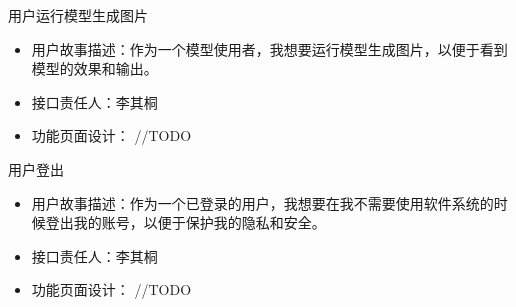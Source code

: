 \begin{frame}{用户运行模型生成图片}
    \begin{itemize}
        \item 用户故事描述：作为一个模型使用者，我想要运行模型生成图片，以便于看到模型的效果和输出。
        \item 接口责任人：李其桐
        \item 功能页面设计： //TODO
    \end{itemize}
\end{frame}

\begin{frame}{用户登出}
    \begin{itemize}
        \item 用户故事描述：作为一个已登录的用户，我想要在我不需要使用软件系统的时候登出我的账号，以便于保护我的隐私和安全。
        \item 接口责任人：李其桐
        \item 功能页面设计： //TODO
    \end{itemize}
\end{frame}